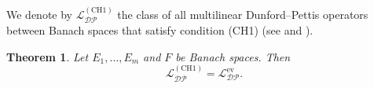 \documentclass[12 pt]{article}%
\newtheorem{theorem}{Theorem}[section]
\newtheorem{lemma}[theorem]{Lemma}
\newtheorem{final remark}[theorem]{Final Remark}
\begin{document}
%		
%
%	


We denote by $\mathcal{L_{DP}^{\mathrm{(CH1)}}}$ the class of all multilinear Dunford–Pettis operators between Banach spaces that satisfy condition (CH1) (see \cite[Definition 3.2]{PR14} and \cite[Definition 2.1]{RST22}).

\begin{theorem}\label{DPCH1}
	Let $E_1,\dots,E_m$ and $F$ be Banach spaces. Then
	\begin{equation*}
		\mathcal{L_{DP}^{\mathrm{(CH1)}}} = \mathcal{L_{DP}^{\mathrm{ev}}}.
	\end{equation*}
\end{theorem}
\end{document}
